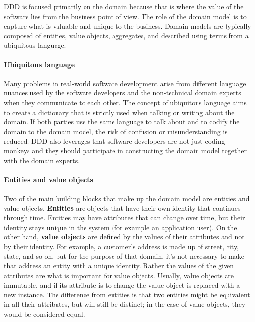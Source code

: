 \documentclass{book}
\begin{document}
DDD is focused primarily on the domain because that is where the value
of the software lies from the business point of view. The role of the
domain model is to capture what is valuable and unique to the business.
Domain models are typically composed of entities, value objects,
aggregates, and described using terms from a ubiquitous language.

\paragraph{Ubiquitous language}\label{ubiquitous-language}

Many problems in real-world software development arise from different
language nuances used by the software developers and the non-technical
domain experts when they communicate to each other. The concept of
ubiquitous language aims to create a dictionary that is strictly used
when talking or writing about the domain. If both parties use the same
language to talk about and to codify the domain to the domain model, the
risk of confusion or misunderstanding is reduced. DDD also leverages
that software developers are not just coding monkeys and they should
participate in constructing the domain model together with the domain
experts.~\cite{journey}

\paragraph{Entities and value objects}\label{entities-and-value-objects}

Two of the main building blocks that make up the domain model are
entities and value objects. \textbf{Entities} are objects that have
their own identity that continues through time. Entities may have
attributes that can change over time, but their identity stays unique in
the system (for example an application user). On the other hand,
\textbf{value objects} are defined by the values of their attributes and
not by their identity. For example, a customer's address is made up of
street, city, state, and so on, but for the purpose of that domain, it's
not necessary to make that address an entity with a unique identity.
Rather the values of the given attributes are what is important for
value objects. Usually, value objects are immutable, and if its
attribute is to change the value object is replaced with a new instance.
The difference from entities is that two entities might be equivalent in
all their attributes, but will still be distinct; in the case of value
objects, they would be considered equal.~\cite{journey}
\end{document}

